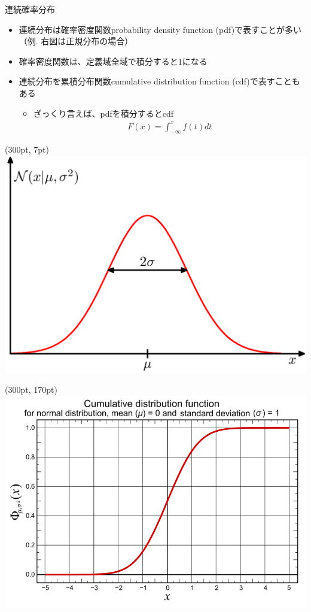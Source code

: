 \documentclass[aspectratio=169,unicode,dvipdfmx,14pt]{beamer}
\begin{document}
\begin{frame}{連続確率分布}
\vspace{.25in}
\begin{itemize}
\item 連続分布は確率密度関数probability density function (pdf)で表すことが多い（例. 右図は正規分布の場合）
\item 確率密度関数は、定義域全域で積分すると1になる
\item 連続分布を累積分布関数cumulative distribution function (cdf)で表すこともある
\begin{itemize}
\item ざっくり言えば、pdfを積分するとcdf
\begin{align}
F(x) = \int_{-\infty}^x f(t) dt
\end{align}
\end{itemize}
\end{itemize}
\begin{textblock*}{0.4\linewidth}(300pt, 7pt)
    \centering
    \includegraphics[width=0.5\linewidth]{Figure1.13.png}
\end{textblock*}
\begin{textblock*}{0.4\linewidth}(300pt, 170pt)
    \centering
    \includegraphics[width=0.6\linewidth]{800px-Cumulative_distribution_function_for_normal_distribution,_mean_0_and_sd_1.png}
\end{textblock*}
\end{frame}
\end{document}
